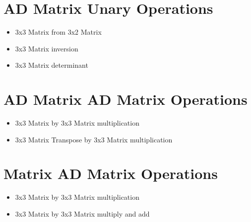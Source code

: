 \documentclass[11pt]{article}
\begin{document}
\section{AD Matrix Unary Operations}\label{sec:ad-matrix-unary-operations}
    \begin{itemize}
        \item 3x3 Matrix from 3x2 Matrix
        \item 3x3 Matrix inversion
        \item 3x3 Matrix determinant
    \end{itemize}

\section{AD Matrix AD Matrix Operations}\label{sec:ad-matrix-ad-matrix-operations}
    \begin{itemize}
        \item 3x3 Matrix by 3x3 Matrix multiplication
        \item 3x3 Matrix Transpose by 3x3 Matrix multiplication
    \end{itemize}

\section{Matrix AD Matrix Operations}\label{sec:matrix-ad-matrix-operations}
    \begin{itemize}
        \item 3x3 Matrix by 3x3 Matrix multiplication
        \item 3x3 Matrix by 3x3 Matrix multiply and add
    \end{itemize}
\end{document}
